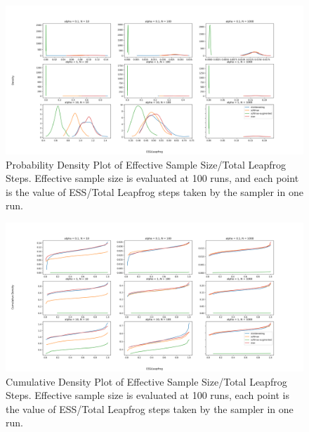 \documentclass[11pt]{article}
\begin{document}
\begin{figure}[t!]
    \centering
    \includegraphics[width=1.2\textwidth]{figures/simplex/ess_density.png}
    \caption{Probability Density Plot of Effective Sample Size/Total Leapfrog Steps. Effective sample size is evaluated at 100 runs, and each point is the value of ESS/Total Leapfrog steps taken by the sampler in one run.}
    \label{fig:ess_density}
\end{figure}

\begin{figure}[t!]
    \centering
    \includegraphics[width=1.2\textwidth]{figures/simplex/ess_cdf.png}
    \caption{Cumulative Density Plot of Effective Sample Size/Total Leapfrog Steps. Effective sample size is evaluated at 100 runs, each point is the value of ESS/Total Leapfrog steps taken by the sampler in one run.}
    \label{fig:ess_cdf}
\end{figure}
\end{document}
